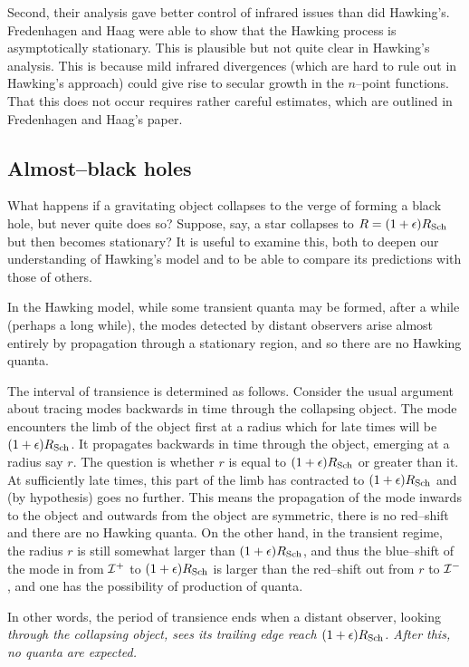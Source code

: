 Second, their analysis gave better control of infrared issues than did
Hawking's.  Fredenhagen and Haag were able to show that the Hawking
process is asymptotically stationary.  This is plausible but not quite
clear in Hawking's analysis.  This is because mild infrared
divergences (which are hard to rule out in Hawking's approach) could
give rise to secular growth in the $n$--point functions.  That this
does not occur requires rather careful estimates, which are outlined
in Fredenhagen and Haag's paper.

\subsection{Almost--black holes}

What happens if a gravitating object collapses to the verge of forming a black
hole, but never quite does so?  Suppose, say, a star collapses to
$R=(1+\epsilon )R_{\rm Sch}$ but then becomes stationary? It is useful to
examine this, both to deepen our understanding of Hawking's model and  to be
able to compare its predictions with those of others.

In the Hawking model, while some transient quanta may be formed, after a while
(perhaps a long while), the modes detected by distant observers arise  almost
entirely by propagation through a stationary region, and so there are no
Hawking quanta.  

The interval of transience is determined as follows.  Consider the usual
argument about tracing modes backwards in time through the collapsing object. 
The mode encounters the limb of the object first at a radius which for late
times will be $(1+\epsilon )R_{\rm Sch}$.  It propagates backwards in time
through the object, emerging at a radius say $r$.  The question is whether $r$
is equal to $(1+\epsilon )R_{\rm Sch}$ or greater than it.  At sufficiently
late times, this part of the limb has contracted to $(1+\epsilon )R_{\rm Sch}$
and (by hypothesis) goes no further.  This means the propagation of the mode
inwards to the object and outwards from the object are symmetric, there is no
red--shift and there are no Hawking quanta.  On the other hand, in the
transient regime, the radius $r$ is still somewhat larger than $(1+\epsilon
)R_{\rm Sch}$, and thus the blue--shift of the mode in from ${\cal I} ^+$ to
$(1+\epsilon )R_{\rm Sch}$ is larger than the red--shift out from $r$ to ${\cal I}
^-$, and one has the possibility of production of quanta.

In other words, the period of transience ends when a distant observer, looking
\it through \rm the collapsing object, sees its trailing edge reach
$(1+\epsilon )R_{\rm Sch}$. After this, no quanta are expected.


